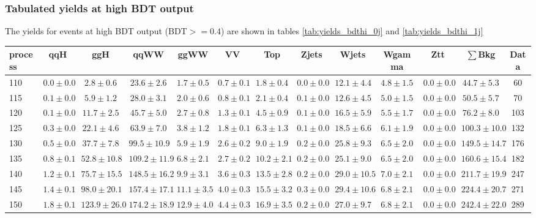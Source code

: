 %
%
%
\subsubsection{Tabulated yields at high BDT output}

The yields for events at high BDT output (BDT$>=0.4$) are shown
in tables \ref{tab:yields_bdthi_0j} and \ref{tab:yields_bdthi_1j}

\begin{table}
{%
 \tiny
 \begin{center}
 \begin{tabular}{l | c c | c c c c c c c c  | c c}
 \hline
 process & qqH & ggH & qqWW & ggWW & VV & Top & Zjets & Wjets & Wgamma & Ztt & $\sum$Bkg & Data \\
 \hline
110 & $0.0\pm0.0$ & $2.8\pm0.6$ & $23.6\pm2.6$ & $1.7\pm0.5$ & $0.7\pm0.1$ & $1.8\pm0.4$ & $0.0\pm0.0$ & $12.1\pm4.4$ & $4.8\pm1.5$ & $0.0\pm0.0$ & $44.7\pm5.3$ & 60 \\
115 & $0.1\pm0.0$ & $5.9\pm1.2$ & $28.0\pm3.1$ & $2.0\pm0.6$ & $0.8\pm0.1$ & $2.1\pm0.4$ & $0.1\pm0.0$ & $12.6\pm4.5$ & $5.0\pm1.5$ & $0.0\pm0.0$ & $50.5\pm5.7$ & 70 \\
120 & $0.1\pm0.0$ & $11.7\pm2.5$ & $45.7\pm5.0$ & $2.7\pm0.8$ & $1.3\pm0.1$ & $4.5\pm0.9$ & $0.1\pm0.0$ & $16.5\pm5.9$ & $5.5\pm1.7$ & $0.0\pm0.0$ & $76.2\pm8.0$ & 103 \\
125 & $0.3\pm0.0$ & $22.1\pm4.6$ & $63.9\pm7.0$ & $3.8\pm1.2$ & $1.8\pm0.1$ & $6.3\pm1.3$ & $0.1\pm0.0$ & $18.5\pm6.6$ & $6.1\pm1.9$ & $0.0\pm0.0$ & $100.3\pm10.0$ & 132 \\
130 & $0.5\pm0.0$ & $37.7\pm7.8$ & $99.5\pm10.9$ & $5.9\pm1.9$ & $2.6\pm0.2$ & $9.0\pm1.9$ & $0.2\pm0.0$ & $25.8\pm9.3$ & $6.5\pm2.0$ & $0.0\pm0.0$ & $149.5\pm14.7$ & 176 \\
135 & $0.8\pm0.1$ & $52.8\pm10.8$ & $109.2\pm11.9$ & $6.8\pm2.1$ & $2.7\pm0.2$ & $10.2\pm2.1$ & $0.2\pm0.0$ & $25.1\pm9.0$ & $6.5\pm2.0$ & $0.0\pm0.0$ & $160.6\pm15.4$ & 182 \\
140 & $1.2\pm0.1$ & $75.7\pm15.5$ & $148.5\pm16.2$ & $9.9\pm3.1$ & $3.6\pm0.3$ & $13.5\pm2.8$ & $0.2\pm0.0$ & $29.0\pm10.5$ & $7.0\pm2.1$ & $0.0\pm0.0$ & $211.7\pm19.9$ & 247 \\
145 & $1.4\pm0.1$ & $98.0\pm20.1$ & $157.4\pm17.1$ & $11.1\pm3.5$ & $4.0\pm0.3$ & $15.5\pm3.2$ & $0.3\pm0.0$ & $29.4\pm10.6$ & $6.8\pm2.1$ & $0.0\pm0.0$ & $224.4\pm20.7$ & 271 \\
150 & $1.8\pm0.1$ & $123.9\pm26.0$ & $174.2\pm18.9$ & $12.9\pm4.0$ & $4.4\pm0.3$ & $16.9\pm3.5$ & $0.2\pm0.0$ & $27.0\pm9.7$ & $6.8\pm2.1$ & $0.0\pm0.0$ & $242.4\pm22.0$ & 289 \\

\end{tabular}
\end{center}}
\end{table}
